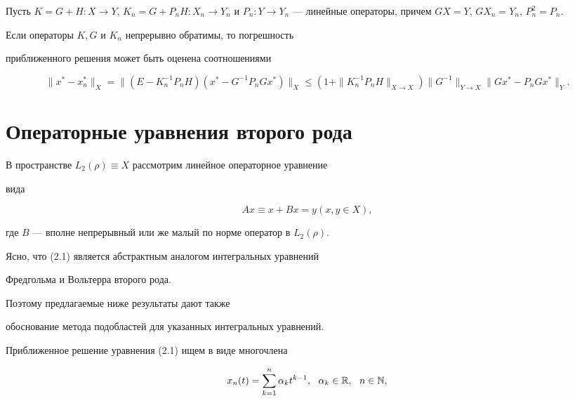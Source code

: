 \begin{lems}


Пусть $K=G+H:X\to Y$, $K_n=G+P_nH:X_n\to Y_n$ и $P_n:


Y\to Y_n$ --- линейные операторы, причем $GX=Y$, $GX_n=Y_n$, $P_n^2=P_n$.


Если операторы $K, G$ и $K_n$ непрерывно обратимы, то погрешность


приближенного решения может быть оценена соотношениями


$$


\|x^*-x^*_n\|_X = \|(E-K_n^{-1}P_nH)(x^*-G^{-1}P_nGx^*)\|_X \le


(1+\|K_n^{-1}P_nH\|_{X\to X})\|G^{-1}\|_{Y\to X}\|Gx^*-P_nGx^*\|_Y.


$$


\end{lems}





\section{Операторные уравнения второго рода}





В пространстве $L_2(\rho)\equiv X$ рассмотрим линейное операторное уравнение


вида


\begin{equation}


Ax\equiv x + Bx = y (x,y \in X),


\end{equation}


где $B$ --- вполне непрерывный или же малый по норме оператор в $L_2(\rho)$.


Ясно, что (2.1) является абстрактным аналогом интегральных уравнений


Фредгольма и Вольтерра второго рода. 


Поэтому предлагаемые ниже результаты дают также


обоснование метода подобластей для указанных интегральных уравнений.





Приближенное решение уравнения (2.1) ищем в виде многочлена


\begin{equation}


x_n(t)=\sum_{k=1}^{n}\alpha_kt^{k-1},\ \ \alpha_k\in \Bbb R,\ \ n\in \Bbb N,


\end{equation}


